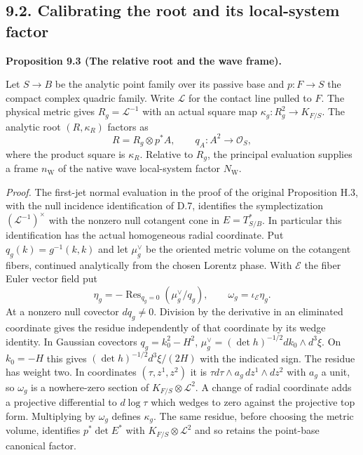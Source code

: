 \documentclass[
  english,
  11pt,
  reqno]{amsart}
\makeatletter
\newcommand{\paperdisplaynext}{%
  \let\paper@savedstartsection\@startsection
  \def\@startsection##1##2##3##4##5##6{%
    \let\@startsection\paper@savedstartsection
    \@tempskipa ##5\relax
    \ifdim\@tempskipa<\z@
      \def\paper@afterskip{.35\baselineskip}%
    \else
      \def\paper@afterskip{##5}%
    \fi
    \@startsection{##1}{##2}{##3}{##4}{\paper@afterskip}{##6}}}
\newcommand{\paperdisplaysection}{\paperdisplaynext\subsection}
\newcommand{\pandocstatementheading}[1]{%
  \par\if@nobreak\else
    \addpenalty{\@beginparpenalty}%
    \addvspace{.5\baselineskip plus .2\baselineskip minus .2\baselineskip}%
  \fi
  {\normalfont\bfseries #1\par}%
  \nobreak\@afterindenttrue\@afterheading
}
\let\paper@displaysection\paperdisplaysection
\renewcommand{\paperdisplaysection}[1]{%
  \let\paper@savedhangfrom\@hangfrom
  \long\def\@hangfrom##1##2{%
    \paper@savedhangfrom{##1}{\paper@headingparagraph##2}}%
  \paper@displaysection{#1}%
  \let\@hangfrom\paper@savedhangfrom}
\makeatother
\begin{document}
\paperdisplaysection{9.2. Calibrating the root and its local-system
factor}\label{calibrating-the-root-and-its-local-system-factor}\label{sec:analytic-framing}

\pandocstatementheading{\leavevmode{}\label{prop:relative-residue-calibration}Proposition 9.3 (The relative root and the wave frame).}

Let \(S\to B\) be the analytic point family over its passive base and
\(p:F\to S\) the compact complex quadric family. Write \(\mathcal L\)
for the contact line pulled to \(F\). The physical metric gives
\(R_g=\mathcal L^{-1}\) with an actual square map
\(\kappa_g:R_g^2\to K_{F/S}\). The analytic root \((R,\kappa_R)\)
factors as%
 \[
R=R_g\otimes p^*A,\qquad q_A:A^2\longrightarrow\mathcal O_S,
\] where the product square is \(\kappa_R\). Relative to \(R_g\), the
principal evaluation supplies a frame \(n_{\mathrm W}\) of the native
wave local-system factor \(N_{\mathrm W}\).

\emph{Proof.} The first-jet normal evaluation in the proof of the
original Proposition H.3, with the null incidence identification of D.7,
identifies the symplectization \((\mathcal L^{-1})^\times\) with the
nonzero null cotangent cone in \(E=T^*_{S/B}\). In particular this
identification has the actual homogeneous radial coordinate. Put
\(q_g(k)=g^{-1}(k,k)\) and let \(\mu_g^\vee\) be the oriented metric
volume on the cotangent fibers, continued analytically from the chosen
Lorentz phase. With \(\mathscr E\) the fiber Euler vector field put%
 \[
\eta_g=-\operatorname{Res}_{q_g=0}(\mu_g^\vee/q_g),\qquad
\omega_g=\iota_{\mathscr E}\eta_g .
\] At a nonzero null covector \(dq_g\ne0\). Division by the derivative
in an eliminated coordinate gives the residue independently of that
coordinate by its wedge identity. In Gaussian covectors
\(q_g=k_0^2-H^2\), \(\mu_g^\vee=(\det h)^{-1/2}dk_0\wedge d^3\xi\). On
\(k_0=-H\) this gives \((\det h)^{-1/2}d^3\xi/(2H)\) with the indicated
sign. The residue has weight two. In coordinates \((\tau,z^1,z^2)\) it
is \(\tau d\tau\wedge a_g\,dz^1\wedge dz^2\) with \(a_g\) a unit, so
\(\omega_g\) is a nowhere-zero section of
\(K_{F/S}\otimes\mathcal L^2\). A change of radial coordinate adds a
projective differential to \(d\log\tau\) which wedges to zero against
the projective top form. Multiplying by \(\omega_g\) defines
\(\kappa_g\). The same residue, before choosing the metric volume,
identifies \(p^*\det E^*\) with \(K_{F/S}\otimes\mathcal L^2\) and so
retains the point-base canonical factor.
\end{document}

